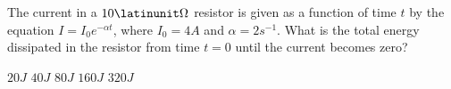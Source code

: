 \begin{questions}\setcounter{question}{16}\question
The current in a $10 \latinunit\Omega$ resistor is given as a function of time $t$ by the equation $I=I_{0} e^{-\alpha t}$, where $I_{0}=4 \unit{A}$ and $\alpha=2 \unit{s^{-1}}$. What is the total energy dissipated in the resistor from time $t=0$ until the current becomes zero?

\begin{oneparchoices}
\choice $20 \unit{J}$
\choice $40 \unit{J}$
\choice $80 \unit{J}$
\choice $160 \unit{J}$
\choice $320 \unit{J}$
\end{oneparchoices}\end{questions}

